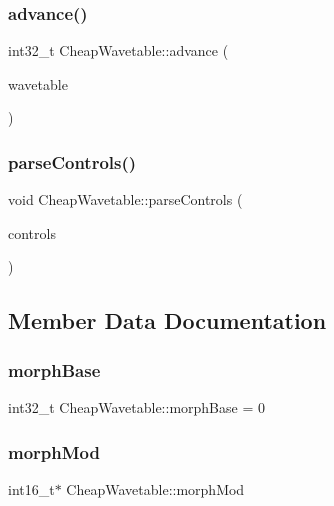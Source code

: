 \subsubsection{\texorpdfstring{advance()}{advance()}}
{\footnotesize\ttfamily int32\+\_\+t Cheap\+Wavetable\+::advance (\begin{DoxyParamCaption}\item[{uint32\+\_\+t $\ast$}]{wavetable }\end{DoxyParamCaption})}

\mbox{\label{class_cheap_wavetable_ae93cc1f2b00fdbc7f6b42b39213b9830}} 
\subsubsection{\texorpdfstring{parse\+Controls()}{parseControls()}}
{\footnotesize\ttfamily void Cheap\+Wavetable\+::parse\+Controls (\begin{DoxyParamCaption}\item[{\mbox{\hyperlink{class_via_controls}{Via\+Controls}} $\ast$}]{controls }\end{DoxyParamCaption})}



\subsection{Member Data Documentation}
\mbox{\label{class_cheap_wavetable_a36112b34b09daac721ff911baef863b6}} 
\subsubsection{\texorpdfstring{morph\+Base}{morphBase}}
{\footnotesize\ttfamily int32\+\_\+t Cheap\+Wavetable\+::morph\+Base = 0}

\mbox{\label{class_cheap_wavetable_afd56507343b52456f5e0045ef10758ca}} 
\subsubsection{\texorpdfstring{morph\+Mod}{morphMod}}
{\footnotesize\ttfamily int16\+\_\+t$\ast$ Cheap\+Wavetable\+::morph\+Mod}


